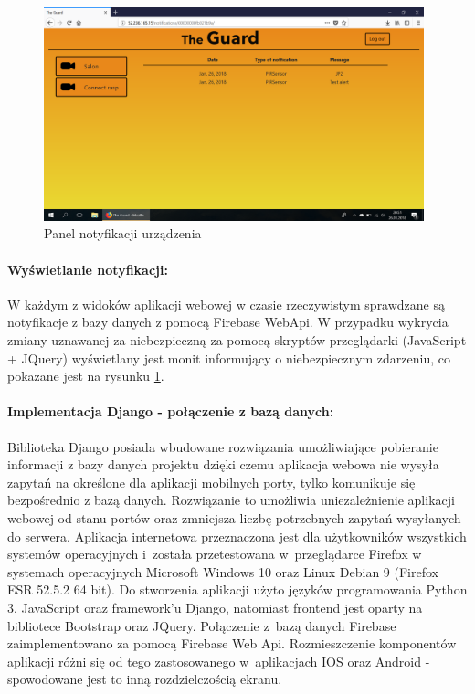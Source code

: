 \begin{figure}[ht]
	\centering
	\includegraphics[width=11cm]{web_screenshots/rasp_notifications.png}
	\caption{Panel notyfikacji urządzenia}
	\label{web_rasp_notifications}
\end{figure}


\paragraph{Wyświetlanie notyfikacji:} W każdym z widoków aplikacji webowej w czasie rzeczywistym sprawdzane są notyfikacje z bazy danych z pomocą Firebase WebApi. W przypadku wykrycia zmiany uznawanej za niebezpieczną za pomocą skryptów przeglądarki (JavaScript + JQuery) wyświetlany jest monit informujący o niebezpiecznym zdarzeniu, co pokazane jest na rysunku \ref{web_rasp_notifications}.  


\paragraph{Implementacja Django - połączenie z bazą danych:}
Biblioteka Django posiada wbudowane rozwiązania umożliwiające pobieranie informacji z bazy danych projektu dzięki czemu aplikacja webowa nie wysyła zapytań na określone dla aplikacji mobilnych porty, tylko komunikuje się bezpośrednio z bazą danych. Rozwiązanie to umożliwia uniezależnienie aplikacji webowej od stanu portów oraz zmniejsza liczbę potrzebnych zapytań wysyłanych do serwera.
Aplikacja internetowa przeznaczona jest dla użytkowników wszystkich systemów operacyjnych i~została przetestowana w~przeglądarce Firefox w systemach operacyjnych Microsoft Windows 10 oraz Linux Debian 9 (Firefox ESR 52.5.2 64 bit). Do stworzenia aplikacji użyto języków programowania Python 3, JavaScript oraz framework'u Django, natomiast frontend jest oparty na bibliotece Bootstrap oraz JQuery. Połączenie z~bazą danych Firebase zaimplementowano za pomocą Firebase Web Api. Rozmieszczenie komponentów aplikacji różni się od tego zastosowanego w~aplikacjach IOS oraz Android - spowodowane jest to inną rozdzielczością ekranu. 

